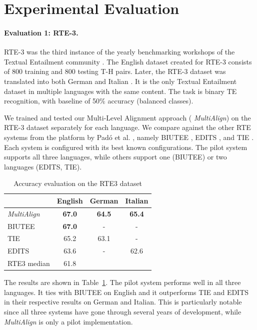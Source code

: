 \documentclass[11pt,letterpaper]{article}
\begin{document}
\section{Experimental Evaluation} 
 
\paragraph{Evaluation 1: RTE-3.}
RTE-3 was the third instance of the yearly benchmarking workshops of
the Textual Entailment community
\cite{giampiccolo07:_third_pascal_recog_textual_entail_chall}. The
English dataset created for RTE-3 consists of 800 training and 800
testing T-H pairs. Later, the RTE-3 dataset was translated into both
German and Italian \cite{Magnini:2014}. %
It is the only Textual Entailment dataset in multiple languages with
the same content. The task is binary TE recognition, with baseline of
50\% accuracy (balanced classes).

We trained and tested our Multi-Level Alignment approach ({\em
  MultiAlign}) on the RTE-3 dataset separately for each language. We
compare against the other RTE systems from the platform by Pad\'o et
al. , namely BIUTEE \cite{Stern:2012}, EDITS
\cite{Kouylekov:2010}, and TIE \cite{Wang:2009}. Each system is
configured with its best known configurations. The pilot system
supports all three languages, while others support one (BIUTEE) or
two languages (EDITS, TIE).

\begin{table}[t!]
\centering
\begin{tabular}{l|ccc}
          &   English   &   German   &   Italian \\
\hline
{\em MultiAlign}&   \textbf{67.0}      &   \textbf{64.5}    &  \textbf{65.4}  \\
BIUTEE        &   \textbf{67.0}      &     -       &     -    \\
TIE           &   65.2       &   63.1    &     -    \\ 
EDITS         &   63.6      &     -       &  62.6  \\ \hline
RTE3 median   &   61.8      &             &          \\

\end{tabular}
\caption{Accuracy evaluation on the RTE3 dataset}
\label{table:rte3}
\end{table}

The results are shown in Table~\ref{table:rte3}. The pilot system
performs well in all three languages. It ties with BIUTEE on English
and it outperforms TIE and EDITS in their respective results on German
and Italian. This is particularly notable since all three systems have
gone through several years of development, while {\em MultiAlign} is
only a pilot implementation. 
\end{document}
